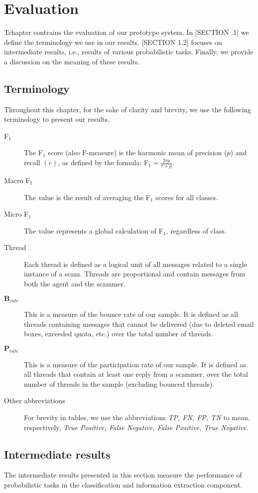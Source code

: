 \chapter{Evaluation}
T\his chapter contrains the evaluation of our prototype system. In [SECTION .1] we define the terminology we use in our results. [SECTION 1.2] focuses on intermediate results, i.e., results of various probabilistic tasks. Finally, we provide a discussion on the meaning of these results.

\section{Terminology}
Throughout this chapter, for the sake of clarity and brevity, we use the following terminology to present our results.
\begin{description}
\item[F$_{1}$] The F$_{1}$ score (also F-measure) is the harmonic mean of precision ($p$) and recall $(r)$, as defined by the formula: F$_{1} = \frac{2rp}{r + p}$.
\item[Macro F$_{1}$] The value is the result of averaging the F$_{1}$ scores for all classes.
\item[Micro F$_{1}$] The value represents a global calculation of F$_{1}$, regardless of class.
\item[Thread] Each thread is defined as a logical unit of all messages related to a single instance of a scam. Threads are proportional and contain messages from both the agent and the scammer.
\item[$\mathbf B_{rate}$] This is a measure of the bounce rate of our sample. It is defined as all threads containing messages that cannot be delivered (due to deleted email boxes, exceeded quota, etc.) over the total number of threads.
\item[$\mathbf P_{rate}$] This is a measure of the participation rate of our sample. It is defined as all threads that contain at least one reply from a scammer, over the total number of threads in the sample (excluding bounced threads).
\item[Other abbreviations] For brevity in tables, we use the abbreviations \textit{TP, FN, FP, TN} to mean, respectively, \textit{True Positive, False Negative, False Positive, True Negative}.
\end{description}

\section{Intermediate results}
The intermediate results presented in this section measure the performance of probabilistic tasks in the classification and information extraction component.

